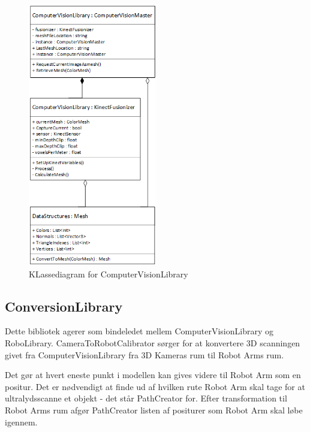 \begin{figure}[H]
    \centering
    \includegraphics[width=0.5\textwidth]{figurer/d/Design/Class/uml_class_computervisionlibrary}
    \caption{KLassediagram for ComputerVisionLibrary}
    \label{class_ComputerVisionLib}
\end{figure}
\newpage
\subsection{ConversionLibrary}
Dette bibliotek agerer som bindeledet mellem ComputerVisionLibrary og RoboLibrary.
CameraToRobotCalibrator sørger for at konvertere 3D scanningen givet fra ComputerVisionLibrary fra 3D Kameras rum til Robot Arms rum.

Det gør at hvert eneste punkt i modellen kan gives videre til Robot Arm som en positur.
Det er nødvendigt at finde ud af hvilken rute Robot Arm skal tage for at ultralydsscanne et objekt - det står PathCreator for.
Efter transformation til Robot Arms rum afgør PathCreator listen af positurer som Robot Arm skal løbe igennem.



